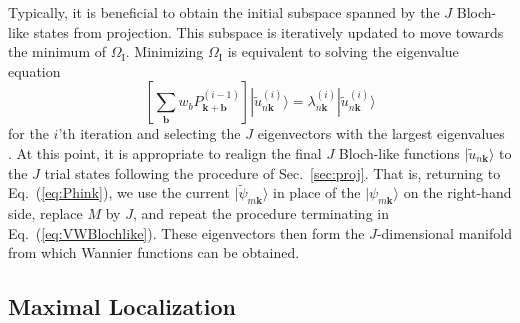 \documentclass[galley,aps,pra,10pt,amsmath,amssymb,
    superscriptaddress,nofootinbib,longbibliography]{revtex4-2}
\newcounter{comm}
\newcommand{\eq}[1]{Eq.~(\ref{eq:#1})}
\newcommand{\sref}[1]{Sec.~\ref{sec:#1}}
\newcommand{\ket}[1]{\vert#1\rangle}
\begin{document}
Typically, it is beneficial to obtain the initial subspace spanned by the $J$ Bloch-like states from projection. This subspace is iteratively updated to move towards the minimum of $\Omega_\textrm{I}$. Minimizing $\Omega_\textrm{I}$ is equivalent to solving the eigenvalue equation
\begin{equation}
    \left[ \sum_{\mathbf{b}} w_b P_{\mathbf{k+b}}^{(i-1)}\right] |\tilde{u}_{n\mathbf{k}}^{(i)}\rangle = \lambda_{n\mathbf{k}}^{(i)}  |\tilde{u}_{n\mathbf{k}}^{(i)}\rangle
\end{equation}
for the $i$'th iteration and selecting the $J$ eigenvectors with the largest eigenvalues \cite{souza2001, marzari2012}. At this point, it is appropriate to realign the final $J$ Bloch-like functions $|\tilde{u}_{n\mathbf{k}}\rangle$ to the $J$ trial states following the procedure of \sref{proj}. That is, returning to \eq{Phink}, we use the current $\ket{\tilde{\psi}_{m\mathbf{k}}}$ in place of the $\ket{\psi_{m\mathbf{k}}}$ on the right-hand side, replace $M$ by $J$, and repeat the procedure terminating in \eq{VWBlochlike}. These eigenvectors then form the $J$-dimensional manifold from which Wannier functions can be obtained.

\subsection{Maximal Localization}
\end{document}
